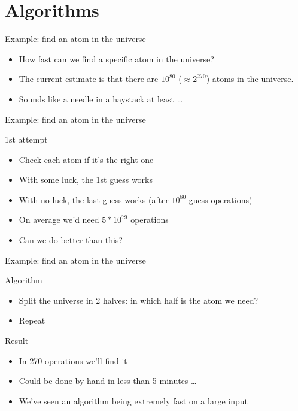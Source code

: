 \documentclass[presentation]{beamer}
\begin{document}
\section{Algorithms}
\label{sec-2}
\begin{frame}[label=sec-2-1]{Example: find an atom in the universe}
\begin{itemize}
\item How fast can we find a specific atom in the universe?
\item The current estimate is that there are $10^{80}$ ($\approx2^{270}$) atoms in the universe.
\item Sounds like a needle in a haystack at least \ldots{}
\end{itemize}
\end{frame}
\begin{frame}[label=sec-2-2]{Example: find an atom in the universe}
\begin{block}{1st attempt}
\begin{itemize}
\item Check each atom if it's the right one
\item With some luck, the 1st guess works
\item With no luck, the last guess works (after $10^{80}$ guess operations)
\item On average we'd need $5*10^79$ operations
\item Can we do better than this?
\end{itemize}
\end{block}
\end{frame}
\begin{frame}[label=sec-2-3]{Example: find an atom in the universe}
\begin{block}{Algorithm}
\begin{itemize}
\item Split the universe in 2 halves: in which half is the atom we need?
\item Repeat
\end{itemize}
\end{block}
\begin{block}{Result}
\begin{itemize}
\item In 270 operations we'll find it
\item Could be done by hand in less than 5 minutes \ldots{}
\item We've seen an algorithm being extremely fast on a large input
\end{itemize}
\end{block}
\end{frame}
\end{document}
